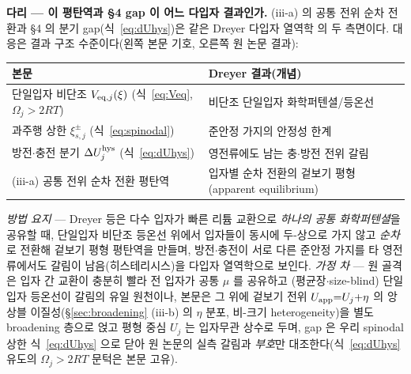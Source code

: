 \begin{srcbox}
\textbf{다리 --- 이 평탄역과 §4 gap 이 어느 다입자 결과인가.} (iii-a) 의 공통 전위 순차 전환과 §4 의 분기
gap(식~\eqref{eq:dUhys})은 같은 Dreyer 다입자 열역학\cite{dreyer2010,dreyer2011} 의 두 측면이다. 대응은
결과 구조 수준이다(왼쪽 본문 기호, 오른쪽 원 논문 결과):
\begin{center}\footnotesize
\begin{tabular}{@{}ll@{}}
\hline
본문 & Dreyer\cite{dreyer2010,dreyer2011} 결과(개념) \\
\hline
단일입자 비단조 $V_{\mathrm{eq},j}(\xi)$ (식~\eqref{eq:Veq}, $\Omega_j{>}2RT$) & 비단조 단일입자 화학퍼텐셜/등온선 \\
과주행 상한 $\xi_{s,j}^\pm$ (식~\eqref{eq:spinodal}) & 준안정 가지의 안정성 한계 \\
방전$\cdot$충전 분기 $\Delta U_j^{\mathrm{hys}}$ (식~\eqref{eq:dUhys}) & 영전류에도 남는 충$\cdot$방전 전위 갈림 \\
(iii-a) 공통 전위 순차 전환 평탄역 & 입자별 순차 전환의 겉보기 평형(apparent equilibrium) \\
\hline
\end{tabular}
\end{center}
\emph{방법 요지} --- Dreyer 등은 다수 입자가 빠른 리튬 교환으로 \emph{하나의 공통 화학퍼텐셜}을 공유할 때,
단일입자 비단조 등온선 위에서 입자들이 동시에 두-상으로 가지 않고 \emph{순차}로 전환해 겉보기 평형 평탄역을
만들며, 방전$\cdot$충전이 서로 다른 준안정 가지를 타 영전류에서도 갈림이 남음(히스테리시스)을 다입자
열역학으로 보인다. \emph{가정 차} --- 원 골격은 입자 간 교환이 충분히 빨라 전 입자가 공통 $\mu$ 를 공유하고
(평균장$\cdot$size-blind) 단일입자 등온선이 갈림의 유일 원천이나, 본문은 그 위에 겉보기 전위
$U_{\mathrm{app}}{=}U_j{+}\eta$ 의 앙상블 이질성(\S\ref{sec:broadening} (iii-b) 의 $\eta$ 분포, 비-크기
heterogeneity)을 별도 broadening 층으로 얹고 평형 중심 $U_j$ 는 입자무관 상수로 두며, gap 은 우리 spinodal
상한 식~\eqref{eq:dUhys} 으로 닫아 원 논문의 실측 갈림과 \emph{부호}만 대조한다(식~\eqref{eq:dUhys} 유도의
$\Omega_j{>}2RT$ 문턱은 본문 고유).
\end{srcbox}

